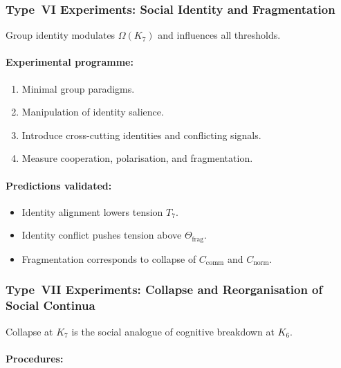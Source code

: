 \subsubsection{Type~VI Experiments: Social Identity and Fragmentation}

Group identity modulates $\Omega(K_7)$ and influences all thresholds.

\paragraph{Experimental programme:}

\begin{enumerate}
    \item Minimal group paradigms.
    \item Manipulation of identity salience.
    \item Introduce cross-cutting identities and conflicting signals.
    \item Measure cooperation, polarisation, and fragmentation.
\end{enumerate}

\paragraph{Predictions validated:}

\begin{itemize}
    \item Identity alignment lowers tension $T_7$.
    \item Identity conflict pushes tension above $\Theta_{\mathrm{frag}}$.
    \item Fragmentation corresponds to collapse of 
          $C_{\mathrm{comm}}$ and $C_{\mathrm{norm}}$.
\end{itemize}



\subsubsection{Type~VII Experiments: Collapse and Reorganisation of Social Continua}

Collapse at $K_7$ is the social analogue of cognitive breakdown at $K_6$.

\paragraph{Procedures:}

